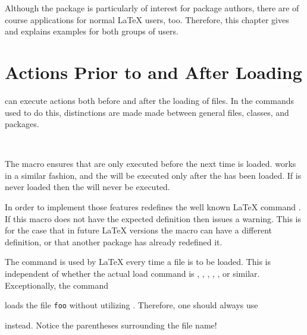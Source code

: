 Although the package is particularly of interest for package authors, there
are of course applications for normal {\LaTeX} users, too.  Therefore, this
chapter gives and explains examples for both groups of users.


\section{Actions Prior to and After Loading}
\label{sec:scrlfile.macros}

 can execute actions both before and after the
loading of files. In the commands used to do this, distinctions are
made made between general files, classes, and packages.

\begin{Declaration}
  \\
\end{Declaration}%
%
%
The macro  ensures that  are
only executed before the next time  is loaded.
 works in a similar fashion, and the
 will be executed only after the  has
been loaded.  If  is never loaded then the
 will never be executed.

In order to implement those features  redefines the well
known {\LaTeX} command . If this macro does not have
the expected definition then  issues a warning.  This is for
the case that in future {\LaTeX} versions the macro can have a different
definition, or that another package has already redefined it.
  
The command  is used by {\LaTeX} every time a file is
to be loaded.  This is independent of whether the actual load command is
, , , ,
, or similar. Exceptionally, the command
\begin{lstcode}[belowskip=\dp\strutbox]
  
\end{lstcode}
loads the file \texttt{foo} without utilizing
. Therefore, one should always use
\begin{lstcode}[belowskip=\dp\strutbox]
  
\end{lstcode}
instead. Notice the parentheses surrounding the file name!%
%
%
%

